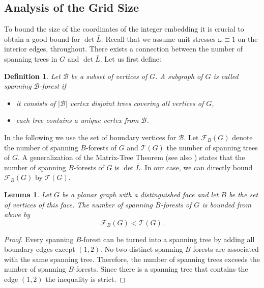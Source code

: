 \documentclass{article}
\theoremstyle{plain} \newtheorem{thm}{Theorem}[section]
\newtheorem{lem}{Lemma}[section]
\newtheorem{defn}{Definition}
\begin{document}
\subsection{Analysis of the Grid Size}
\label{sec:analysis}
To bound the size of the coordinates of the integer embedding it is crucial
to obtain a good bound for $\det \bar L$. 
Recall that we assume unit stresses $\omega \equiv 1$
on the interior edges, throughout.
There exists a connection between the
number of spanning trees in $G$ and $\det\bar L$. Let us first define:
\begin{defn}
 Let $\mathcal{B}$ be a subset of vertices of $G$. A subgraph of $G$ is 
 called \emph{spanning $\mathcal{B}$-forest} if 
 \begin{itemize}
 \item it consists of $|\mathcal{B}|$ vertex disjoint trees covering
   all vertices of $G$,
 \item each tree contains a unique vertex from $\mathcal{B}$.
 \end{itemize}
\end{defn}
In the following we use the set of boundary vertices  for  $\mathcal{B}$.
Let $\mathcal{F}_B(G)$ denote the number of spanning $B$-forests of $G$ and 
$\mathcal{T}(G)$ the number of spanning trees of $G$.
A generalization of the Matrix-Tree Theorem
\cite{l-gmtt-82} (see also
\cite{r-rcpps-06}) states that the number of spanning $B$-forests of $G$
is $\det\bar L$.
In our case, we can directly bound $\mathcal{F}_B(G)$ by $\mathcal{T}(G)$. 
\begin{lem}\label{lem:foresttree}
Let $G$ be a planar graph with a distinguished face and let $B$ be the
set of vertices of this face. 
The number of spanning $B$-forests of $G$ is bounded
from above by
\[  \mathcal{F}_B(G) <  \mathcal{T}(G).\]
\end{lem}
\begin{proof}
Every spanning $B$-forest can be turned into a spanning tree by adding all
boundary edges except $(1,2)$. No two distinct spanning $B$-forests
are associated with the same spanning tree. Therefore, the number
of spanning trees exceeds the number of spanning $B$-forests.
Since there is a spanning tree that contains the edge $(1,2)$ the inequality is strict.
\end{proof}
\end{document}
